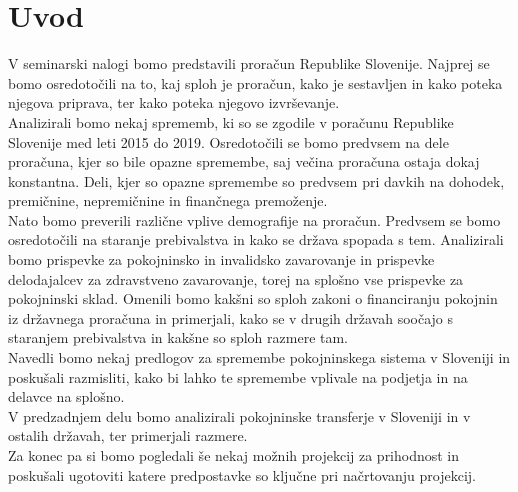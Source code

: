 \documentclass[12pt, a4paper]{article}
\begin{document}
\newpage

\tableofcontents
\vspace{20mm}

\newpage
\section[Uvod]{Uvod}
\hspace*{5mm} V seminarski nalogi bomo predstavili proračun Republike Slovenije. Najprej se bomo osredotočili na to, kaj sploh je proračun, kako je sestavljen in kako poteka njegova priprava, ter kako poteka njegovo izvrševanje.\\
\hspace*{5mm} Analizirali bomo nekaj sprememb, ki so se zgodile v poračunu Republike Slovenije med leti 2015 do 2019. Osredotočili se bomo predvsem na dele proračuna, kjer so bile opazne spremembe, saj večina proračuna ostaja dokaj konstantna. Deli, kjer so opazne spremembe so predvsem pri davkih na dohodek, premičnine, nepremičnine in finančnega premoženje.\\
\hspace*{5mm} Nato bomo preverili različne vplive demografije na proračun. Predvsem se bomo osredotočili na staranje prebivalstva in kako se država spopada s tem. Analizirali bomo prispevke za pokojninsko in invalidsko zavarovanje in prispevke delodajalcev za zdravstveno zavarovanje, torej na splošno vse prispevke za pokojninski sklad. Omenili bomo kakšni so sploh zakoni o financiranju pokojnin iz državnega proračuna in primerjali, kako se v drugih državah soočajo s staranjem prebivalstva in kakšne so sploh razmere tam.\\
\hspace*{5mm} Navedli bomo nekaj predlogov za spremembe pokojninskega sistema v Sloveniji in poskušali razmisliti, kako bi lahko te spremembe vplivale na podjetja in na delavce na splošno.\\
\hspace*{5mm} V predzadnjem delu bomo analizirali pokojninske transferje v Sloveniji in v ostalih državah, ter primerjali razmere.\\
\hspace*{5mm} Za konec pa si bomo pogledali še nekaj možnih projekcij za prihodnost in poskušali ugotoviti katere predpostavke so ključne pri načrtovanju projekcij.
\\
\newpage
\end{document}
